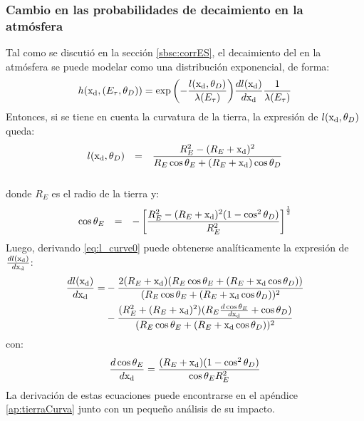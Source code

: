 	\subsubsection{Cambio en las probabilidades de decaimiento en la atm\'osfera}
	Tal como se discuti\'o en la secci\'on \ref{sbsc:corrES}, el decaimiento del \tauon{} en la atm\'osfera se puede modelar como una distribuci\'on exponencial, de forma:
	\begin{equation}
		h({\rm x_d},(E_\tau,\theta_D))=
		\exp{\left(
		-\frac{l({\rm x_d},\theta_D)}{\lambda(E_\tau)}
		\right)}
		\frac{dl({\rm x_d})}{d{\rm x_d}}
		\frac{1}{\lambda(E_\tau)}
		\label{eq:decayTayRadio}
	\end{equation}
	Entonces, si se tiene en cuenta la curvatura de la tierra, la expresi\'on de $l({\rm x_d},\theta_D)$ queda:
	\begin{equation}
		\begin{array}{rcl}
		l({\rm x_d},\theta_D) & = & \dfrac{R_E^2-(R_E+{\rm x_d})^2}{R_E \cos \theta_E + (R_E+{\rm x_d}) \cos \theta_D}\\
		&&\\
		\end{array}
		\label{eq:l_curve0}
	\end{equation}
	donde $R_E$ es el radio de la tierra y:
	\begin{equation}
		\begin{array}{rcl}
		\cos \theta_E & = & - \left[ \dfrac{R_E^2 - (R_E+{\rm x_d})^2 (1-\cos^2 \theta_D)}{R_E^2} \right]^{\frac{1}{2}} \\ 
		\end{array}
		\label{eq:te_td0}
	\end{equation}
	Luego, derivando \ref{eq:l_curve0} puede obtenerse anal\'iticamente la expresi\'on de $\frac{dl({\rm x_d})}{d{\rm x_d}}$:
	\begin{equation}
	\begin{aligned}
		\frac{dl({\rm x_d})}{d{\rm x_d}}
		=&-
		\frac{
		2(R_E+{\rm x_d})
		(R_E\cos{\theta_E}+(R_E+{\rm x_d}\cos{\theta_D}))
		}{
		(R_E\cos{\theta_E}+(R_E+{\rm x_d}\cos{\theta_D}))^2
		}\\
		&-
		\frac{(R_E^2+(R_E+{\rm x_d})^2)(R_E\frac{d\cos{\theta_E}}{d{\rm x_d}}+\cos{\theta_D})
		}{
		(R_E\cos{\theta_E}+(R_E+{\rm x_d}\cos{\theta_D}))^2
		}
	\end{aligned}
	\end{equation}
	con:
	\begin{equation}
	\frac{d\cos{\theta_E}}{d{\rm x_d}}
	=
	\frac{
	(R_E+{\rm x_d})
	(1-\cos^2\theta_D)
	}{\cos{\theta_E}R_E^2
	}
	\end{equation}
	La derivaci\'on de estas ecuaciones puede encontrarse en el ap\'endice \ref{ap:tierraCurva} junto con un peque\~no an\'alisis de su impacto.
	
